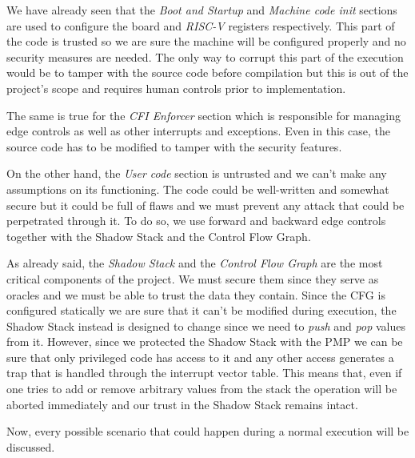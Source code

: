 We have already seen that the \textit{Boot and Startup} and \textit{Machine code
init} sections are used to configure the board and \textit{RISC-V} registers respectively.
This part of the code is trusted so we are sure the machine will be configured
properly and no security measures are needed. The only way to corrupt this part of
the execution would be to tamper with the source code before compilation but this
is out of the project's scope and requires human controls prior to implementation.

The same is true for the \textit{CFI Enforcer} section which is responsible for
managing edge controls as well as other interrupts and exceptions. Even in this case,
the source code has to be modified to tamper with the security features.

On the other hand, the \textit{User code} section is untrusted and we can't make
any assumptions on its functioning. The code could be well-written and somewhat secure
but it could be full of flaws and we must prevent any attack that could be perpetrated
through it. To do so, we use forward and backward edge controls together with the
Shadow Stack and the Control Flow Graph.

As already said, the \textit{Shadow Stack} and the \textit{Control Flow Graph}
are the most critical components of the project. We must secure them since they serve
as oracles and we must be able to trust the data they contain. Since the CFG is
configured statically we are sure that it can't be modified during execution, the
Shadow Stack instead is designed to change since we need to \textit{push} and
\textit{pop} values from it. However, since we protected the Shadow Stack with the
PMP we can be sure that only privileged code has access to it and any other access
generates a trap that is handled through the interrupt vector table. This means
that, even if one tries to add or remove arbitrary values from the stack the operation
will be aborted immediately and our trust in the Shadow Stack remains intact.

Now, every possible scenario that could happen during a normal execution will be
discussed.

